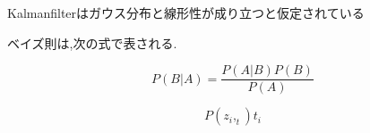 \documentclass[12pt]{jsarticle}
\begin{document}
\beginsection
Kalmanfilterはガウス分布と線形性が成り立つと仮定されている
\endsection


ベイズ則は,次の式で表される.

\begin{equation}
  P(B|A) = \frac{P(A|B)P(B)}{P(A)}
\end{equation}

\begin{equation}
 P(z_i,_t){t_i}
\end{equation}

\end{document}
